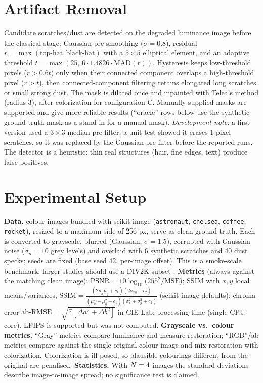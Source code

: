 \documentclass[10pt]{article}
\begin{document}
\section{Artifact Removal}
Candidate scratches/dust are detected on the degraded luminance image before the classical stage: Gaussian pre-smoothing ($\sigma=0.8$), residual $r=\max(\text{top-hat},\text{black-hat})$ with a $5\times5$ elliptical element, and an adaptive threshold
$t=\max(25,\,6\cdot1.4826\cdot\mathrm{MAD}(r))$. Hysteresis keeps low-threshold pixels ($r>0.6t$) only when their connected component overlaps a high-threshold pixel ($r>t$), then connected-component filtering retains elongated long scratches or small strong dust. The mask is dilated once and inpainted with Telea's method (radius 3), after colorization for configuration C.
Manually supplied masks are supported and give more reliable results (``oracle'' rows below use the synthetic ground-truth mask as a stand-in for a manual mask).
\emph{Development note:} a first version used a $3\times3$ median pre-filter; a unit test showed it erases 1-pixel scratches, so it was replaced by the Gaussian pre-filter before the reported runs.
The detector is a heuristic: thin real structures (hair, fine edges, text) produce false positives.

\section{Experimental Setup}
\textbf{Data.} \NImages{} colour images bundled with scikit-image \citep{vanderwalt2014skimage} (\texttt{astronaut}, \texttt{chelsea}, \texttt{coffee}, \texttt{rocket}), resized to a maximum side of 256 px, serve as clean ground truth.
Each is converted to grayscale, blurred (Gaussian, $\sigma=1.5$), corrupted with Gaussian noise ($\sigma_n=10$ grey levels) and overlaid with 6 synthetic scratches and 40 dust specks; seeds are fixed (base seed 42, per-image offset). This is a smoke-scale benchmark; larger studies should use a DIV2K subset \citep{agustsson2017div2k}.
\textbf{Metrics} (always against the matching clean image): $\mathrm{PSNR}=10\log_{10}\!\big(255^{2}/\mathrm{MSE}\big)$; SSIM \citep{wang2004ssim} with $x,y$ local means/variances,
$\mathrm{SSIM}=\frac{(2\mu_x\mu_y+c_1)(2\sigma_{xy}+c_2)}{(\mu_x^2+\mu_y^2+c_1)(\sigma_x^2+\sigma_y^2+c_2)}$ (scikit-image defaults); chroma error $\text{ab-RMSE}=\sqrt{\mathbb E[\Delta a^2+\Delta b^2]}$ in CIE Lab; processing time (single CPU core). LPIPS \citep{zhang2018lpips} is supported but was not computed.
\textbf{Grayscale vs.\ colour metrics.} ``Gray'' metrics compare luminance and measure restoration; ``RGB''/ab metrics compare against the single original colour image and mix restoration with colorization. Colorization is ill-posed, so plausible colourings different from the original are penalised.
\textbf{Statistics.} With $N=4$ images the standard deviations describe image-to-image spread; no significance test is claimed.
\end{document}
